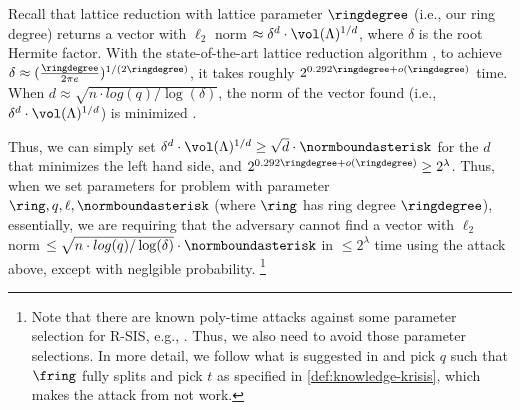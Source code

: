 Recall that lattice reduction with lattice parameter $\ringdegree$ (i.e., our ring degree)
returns a vector with $\ell_2$ norm $\approx \delta^{d} \cdot \vol(\Lambda)^{1/d}$,
where $\delta$ is the root Hermite factor. 
With the state-of-the-art lattice reduction algorithm \cite{SODA:BDGL16},
to achieve $\delta \approx (\frac{\ringdegree}{2\pi  e})^{1/(2\ringdegree)}$,
it takes roughly $2^{0.292\ringdegree + o(\ringdegree)}$ time.
When $d \approx \sqrt{n \cdot log(q) / \log (\delta)}$,
the norm of the vector found (i.e., $\delta^{d} \cdot \vol(\Lambda)^{1/d}$)
is minimized \cite{MR09}.

Thus, we can simply set $\delta^{d} \cdot \vol(\Lambda)^{1/d} \geq \sqrt{d}\cdot \normboundasterisk$
for the $d$ that minimizes the left hand side,
and $2^{0.292\ringdegree + o(\ringdegree)} \geq 2^\lambda$.
Thus, when we set parameters for \rsis problem with parameter $\ring, q, \ell, \normboundasterisk$ (where $\ring$ has ring degree $\ringdegree$),
essentially, we are requiring that the adversary cannot find a vector with $\ell_2$ norm $\leq \sqrt{n \cdot log(q) / \log (\delta)} \cdot \normboundasterisk$
in $\leq 2^\lambda$ time using the attack above,
except with neglgible probability.
\footnote{Note that there are known poly-time attacks against some parameter selection for R-SIS, e.g., \cite{EC:PXWC21}.
Thus, we also need to avoid those parameter selections.
In more detail, we follow what is suggested in \cite{C:ACLMT22} and pick $q$ such that $\fring$ fully splits and pick $t$ as specified in \cref{def:knowledge-krisis},
which makes the attack from \cite{EC:PXWC21} not work.}



